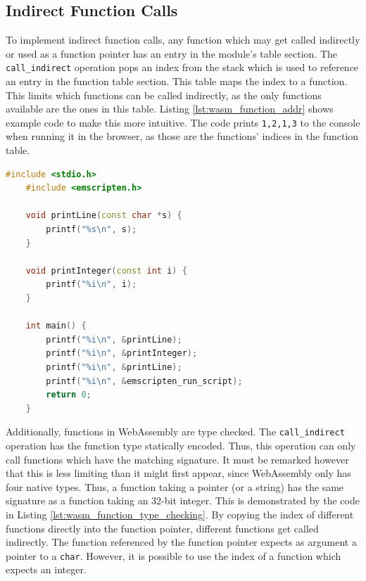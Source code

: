 \documentclass[sigconf]{acmart}
\begin{document}
\subsection{Indirect Function Calls} 
\label{sec:indirect_calls}
To implement indirect function calls, any function which may get called indirectly or used as a function pointer has an entry in the module's table section. The \texttt{call\_indirect} operation pops an index from the stack which is used to reference an entry in the function table section. This table maps the index to a function. This limits which functions can be called indirectly, as the only functions available are the ones in this table. Listing \ref{lst:wasm_function_addr} shows example code to make this more intuitive. The code prints \texttt{1,2,1,3} to the console when running it in the browser, as those are the functions' indices in the function table.

\begin{lstlisting}[language=C++, caption={This Code demonstrates how WebAssembly handles function pointers, by referring to functions using their assigned indices in the module's function table. This code prints \texttt{1,2,1,3 } to the console when running it in the browser.}, label={lst:wasm_function_addr}]
	#include <stdio.h>
	#include <emscripten.h>

	void printLine(const char *s) {
		printf("%s\n", s);
	}

	void printInteger(const int i) {
		printf("%i\n", i);
	}

	int main() {
		printf("%i\n", &printLine);
		printf("%i\n", &printInteger);
		printf("%i\n", &printLine);
		printf("%i\n", &emscripten_run_script);
		return 0;
	}
\end{lstlisting}

Additionally, functions in WebAssembly are type checked. The \texttt{call\_indirect} operation has the function type statically encoded. Thus, this operation can only call functions which have the matching signature. It must be remarked however that this is less limiting than it might first appear, since WebAssembly only has four native types. Thus, a function taking a pointer (or a string) has the same signature as a function taking an 32-bit integer. This is demonstrated by the code in Listing \ref{lst:wasm_function_type_checking}. By copying the index of different functions directly into the function pointer, different functions get called indirectly. The function referenced by the function pointer expects as argument a pointer to a \texttt{char}. However, it is possible to use the index of a function which expects an integer.
\end{document}
